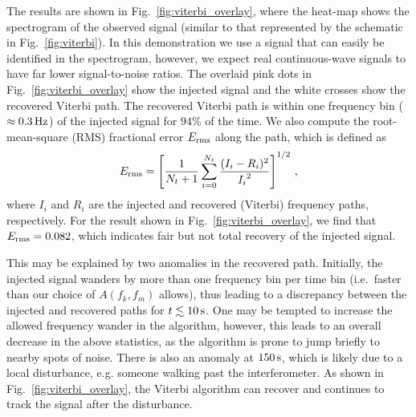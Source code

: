 \documentclass[paper-main.tex]{subfiles}
\begin{document}
The results are shown in Fig.~\ref{fig:viterbi_overlay}, where the heat-map shows the spectrogram of the observed signal (similar to that represented by the schematic in Fig.~\ref{fig:viterbi}). 
In this demonstration we use a signal that can easily be identified in the spectrogram, however, we expect real continuous-wave signals to have far lower signal-to-noise ratios. 
The overlaid pink dots in Fig.~\ref{fig:viterbi_overlay} show the injected signal and the white crosses show the recovered Viterbi path.
The recovered Viterbi path is within one frequency bin ($\approx 0.3\,{\rm Hz}$) of the injected signal for $94\%$ of the time. We also compute the root-mean-square (RMS) fractional error $E_{\rm rms}$ along the path, which is defined as 
\begin{equation}
E_{\rm rms} = \left[ \frac{1}{N_t+1} \sum_{i=0}^{N_t} \frac{(I_i - R_i)^2}{{I_i}^2} \right] ^{1/2}\,,
\end{equation}
where $I_i$ and $R_i$ are the injected and recovered (Viterbi) frequency paths, respectively. 
For the result shown in Fig.~\ref{fig:viterbi_overlay}, we find that $E_{\rm rms} = 0.082$, which indicates fair but not total recovery of the injected signal.



This may be explained by two anomalies in the recovered path. Initially, the injected signal wanders by more than one frequency bin per time bin (i.e.\ faster than our choice of $A(f_k,f_m)$ allows), thus leading to a discrepancy between the injected and recovered paths for $t\lesssim 10\,{\rm s}$. One may be tempted to increase the allowed frequency wander in the algorithm, however, this leads to an overall decrease in the above statistics, as the algorithm is prone to jump briefly to nearby spots of noise. There is also an anomaly at $150\,{\rm s}$, which is likely due to a local disturbance, e.g. someone walking past the interferometer. 
As shown in Fig.~\ref{fig:viterbi_overlay}, the Viterbi algorithm can recover and continues to track the signal after the disturbance. 
\end{document}
